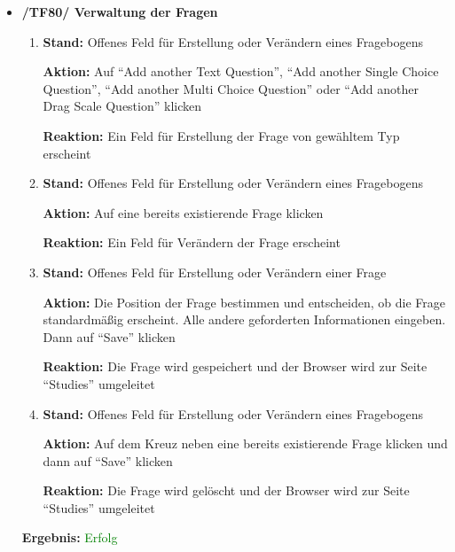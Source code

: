 \documentclass[a4paper]{scrreprt}
\begin{document}
\begin{itemize}
		                      \item \textbf{/TF80/ Verwaltung der Fragen}
		                              \begin{enumerate}
		                              \item \par \textbf{Stand: }Offenes Feld f\"ur Erstellung oder Ver\"andern eines Fragebogens
		                                    \par \textbf{Aktion: }Auf ``Add another Text Question'', ``Add another Single Choice Question'', ``Add another Multi Choice Question'' oder ``Add another Drag Scale Question'' klicken
		                                    \par \textbf{Reaktion: }Ein Feld f\"ur Erstellung der Frage von gew\"ahltem Typ erscheint
		                              \item \par \textbf{Stand: }Offenes Feld f\"ur Erstellung oder Ver\"andern eines Fragebogens
		                                    \par \textbf{Aktion: }Auf eine bereits existierende Frage klicken
		                                    \par \textbf{Reaktion: }Ein Feld f\"ur Ver\"andern der Frage erscheint
		                              \item \par \textbf{Stand: }Offenes Feld f\"ur Erstellung oder Ver\"andern einer Frage
		                                    \par \textbf{Aktion: }Die Position der Frage bestimmen und entscheiden, ob die Frage standardm\"aßig erscheint. Alle andere geforderten Informationen eingeben. Dann auf ``Save'' klicken
		                                    \par \textbf{Reaktion: }Die Frage wird gespeichert und der Browser wird zur Seite ``Studies'' umgeleitet
		                              \item \par \textbf{Stand: }Offenes Feld f\"ur Erstellung oder Ver\"andern eines Fragebogens
		                                    \par \textbf{Aktion: }Auf dem Kreuz neben eine bereits existierende Frage klicken und dann auf ``Save'' klicken
		                                    \par \textbf{Reaktion: }Die Frage wird gel\"oscht und der Browser wird zur Seite ``Studies'' umgeleitet
		                          \end{enumerate}
		      					\vspace*{0.3cm}
		      		           \par \textbf{Ergebnis: }\textcolor{green}{Erfolg}
		      		           \vspace*{0.6cm}
		

\end{itemize}
\end{document}
